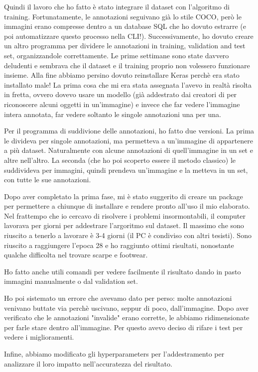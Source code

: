 Quindi il lavoro che ho fatto è stato integrare il dataset con l'algoritmo di training. Fortunatamente, le annotazioni \modanet seguivano già lo stile COCO, però le immagini erano compresse dentro a un database SQL che ho dovuto estrarre (e poi automatizzare questo processo nella CLI!). Successivamente, ho dovuto creare un altro programma per dividere le annotazioni in training, validation and test set, organizzandole correttamente.
Le prime settimane sono state davvero deludenti e sembrava che il dataset e il training proprio non volessero funzionare insieme. Alla fine abbiamo persino dovuto reinstallare Keras perchè era stato installato male! La prima cosa che mi era stata assegnata l'avevo in realtà risolta in fretta, ovvero dovevo usare un modello (già addestrato dai creatori di \maskrcnn per riconoscere alcuni oggetti in un'immagine) e invece che far vedere l'immagine intera annotata, far vedere soltanto le singole annotazioni una per una.

Per il programma di suddivione delle annotazioni, ho fatto due versioni. La prima le divideva per singole annotazioni, ma permetteva a un'immagine di appartenere a più dataset. Naturalmente con alcune annotazioni di quell'immagine in un set e altre nell'altro. La seconda (che ho poi scoperto essere il metodo classico) le suddivideva per immagini, quindi prendeva un'immagine e la metteva in un set, con tutte le sue annotazioni.

Dopo aver completato la prima fase, mi è stato suggerito di creare un package per permettere a chiunque di installare e rendere pronto all'uso il mio elaborato.
Nel frattempo che io cercavo di risolvere i problemi insormontabili, il computer lavorava per giorni per addestrare l'argoritmo sul dataset. Il massimo che sono riuscito a tenerlo a lavorare è 3-4 giorni (il PC è condiviso con altri tesisti). Sono riuscito a raggiungere l'epoca 28 e ho raggiunto ottimi risultati, nonostante qualche difficolta nel trovare scarpe e footwear.

Ho fatto anche utili comandi per vedere facilmente il risultato dando in pasto immagini manualmente o dal validation set.

Ho poi sistemato un errore che avevamo dato per perso: molte annotazioni venivano buttate via perchè uscivano, seppur di poco, dall'immagine. Dopo aver verificato che le annotazioni "invalide" erano corrette, le abbiamo ridimensionate per farle stare dentro all'immagine. Per questo avevo deciso di rifare i test per vedere i miglioramenti.

Infine, abbiamo modificato gli hyperparameters per l'addestramento per analizzare il loro impatto nell'accuratezza del risultato.



